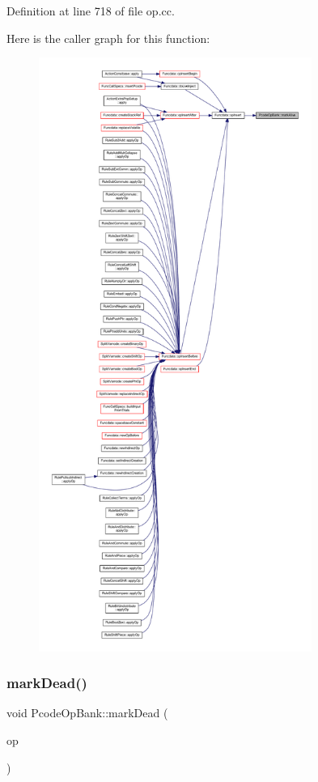 Definition at line 718 of file op.\+cc.

Here is the caller graph for this function\+:
\nopagebreak
\begin{figure}[H]
\begin{center}
\leavevmode
\includegraphics[height=550pt]{class_pcode_op_bank_ae9b41955863d0ff9deaabb27e02429be_icgraph}
\end{center}
\end{figure}
\mbox{\label{class_pcode_op_bank_ad4e924e79e478b3f867a4da3ba6d6c56}} 
\subsubsection{\texorpdfstring{markDead()}{markDead()}}
{\footnotesize\ttfamily void Pcode\+Op\+Bank\+::mark\+Dead (\begin{DoxyParamCaption}\item[{\mbox{\hyperlink{class_pcode_op}{Pcode\+Op}} $\ast$}]{op }\end{DoxyParamCaption})}



